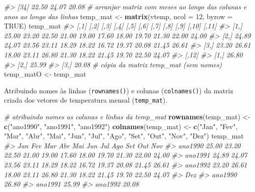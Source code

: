 \documentclass[]{book}
\newenvironment{Shaded}{\begin{snugshade}}{\end{snugshade}}
\newcommand{\KeywordTok}[1]{\textcolor[rgb]{0.13,0.29,0.53}{\textbf{#1}}}
\newcommand{\DataTypeTok}[1]{\textcolor[rgb]{0.13,0.29,0.53}{#1}}
\newcommand{\DecValTok}[1]{\textcolor[rgb]{0.00,0.00,0.81}{#1}}
\newcommand{\StringTok}[1]{\textcolor[rgb]{0.31,0.60,0.02}{#1}}
\newcommand{\CommentTok}[1]{\textcolor[rgb]{0.56,0.35,0.01}{\textit{#1}}}
\newcommand{\OtherTok}[1]{\textcolor[rgb]{0.56,0.35,0.01}{#1}}
\newcommand{\NormalTok}[1]{#1}
\begin{document}
\begin{Shaded}
\begin{Highlighting}[]
\CommentTok{#> [34] 22.50 24.07 20.08}
\CommentTok{# arranjar matrix com meses ao longo das colunas e anos ao longo das linhas}
\NormalTok{temp_mat <-}\StringTok{ }\KeywordTok{matrix}\NormalTok{(vtemp, }\DataTypeTok{ncol =} \DecValTok{12}\NormalTok{, }\DataTypeTok{byrow =} \OtherTok{TRUE}\NormalTok{)}
\NormalTok{temp_mat}
\CommentTok{#>       [,1]  [,2]  [,3]  [,4]  [,5]  [,6]  [,7]  [,8]  [,9] [,10] [,11]}
\CommentTok{#> [1,] 25.00 23.20 22.50 21.00 19.00 17.60 18.00 19.70 21.30 22.00 24.00}
\CommentTok{#> [2,] 24.89 24.07 23.56 23.11 18.29 18.22 16.72 19.37 20.08 21.45 26.61}
\CommentTok{#> [3,] 23.20 26.61 18.00 23.11 26.80 21.30 18.22 21.45 19.70 22.50 24.07}
\CommentTok{#>      [,12]}
\CommentTok{#> [1,] 26.80}
\CommentTok{#> [2,] 25.99}
\CommentTok{#> [3,] 20.08}
\CommentTok{# cópia da matriz temp_mat (sem nomes)}
\NormalTok{temp_matO <-}\StringTok{ }\NormalTok{temp_mat}
\end{Highlighting}
\end{Shaded}

Atribuindo nomes às linhas (\texttt{rownames()}) e colunas
(\texttt{colnames()}) da matriz criada dos vetores de temperatura mensal
(\texttt{temp\_mat}).

\begin{Shaded}
\begin{Highlighting}[]
\CommentTok{# atribuindo nomes as colunas e linhas da temp_mat}
\KeywordTok{rownames}\NormalTok{(temp_mat) <-}\StringTok{ }\KeywordTok{c}\NormalTok{(}\StringTok{"ano1990"}\NormalTok{, }\StringTok{"ano1991"}\NormalTok{, }\StringTok{"ano1992"}\NormalTok{)}
\KeywordTok{colnames}\NormalTok{(temp_mat) <-}\StringTok{ }\KeywordTok{c}\NormalTok{(}\StringTok{"Jan"}\NormalTok{, }\StringTok{"Fev"}\NormalTok{, }\StringTok{"Mar"}\NormalTok{, }\StringTok{"Abr"}\NormalTok{, }\StringTok{"Mai"}\NormalTok{, }\StringTok{"Jun"}\NormalTok{, }\StringTok{"Jul"}\NormalTok{, }\StringTok{"Ago"}\NormalTok{, }
    \StringTok{"Set"}\NormalTok{, }\StringTok{"Out"}\NormalTok{, }\StringTok{"Nov"}\NormalTok{, }\StringTok{"Dez"}\NormalTok{)}
\NormalTok{temp_mat}
\CommentTok{#>           Jan   Fev   Mar   Abr   Mai   Jun   Jul   Ago   Set   Out   Nov}
\CommentTok{#> ano1990 25.00 23.20 22.50 21.00 19.00 17.60 18.00 19.70 21.30 22.00 24.00}
\CommentTok{#> ano1991 24.89 24.07 23.56 23.11 18.29 18.22 16.72 19.37 20.08 21.45 26.61}
\CommentTok{#> ano1992 23.20 26.61 18.00 23.11 26.80 21.30 18.22 21.45 19.70 22.50 24.07}
\CommentTok{#>           Dez}
\CommentTok{#> ano1990 26.80}
\CommentTok{#> ano1991 25.99}
\CommentTok{#> ano1992 20.08}
\end{Highlighting}
\end{Shaded}
\end{document}

